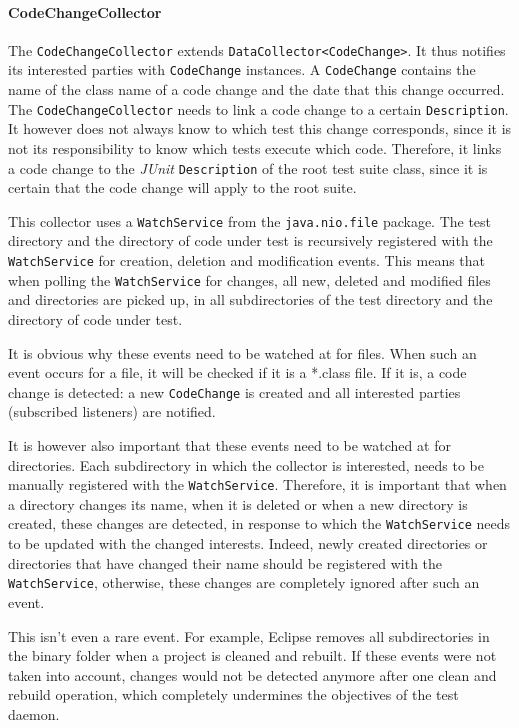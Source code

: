 \documentclass[i2]{oss}
\newcommand{\class}[1]{\texttt{#1}}
\newcommand{\junit}{\emph{JUnit }}
\begin{document}
\paragraph{CodeChangeCollector}

The \class{CodeChangeCollector} extends \class{DataCollector<CodeChange>}.
It thus notifies its interested parties with \class{CodeChange} instances.
A \class{CodeChange} contains the name of the class name of a code change and the date that this change occurred.
The \class{CodeChangeCollector} needs to link a code change to a certain \class{Description}.
It however does not always know to which test this change corresponds, since it is not its responsibility to know which tests execute which code.
Therefore, it links a code change to the \junit \class{Description} of the root test suite class, since it is certain that the code change will apply to the root suite.

This collector uses a \class{WatchService} from the \class{java.nio.file} package.
The test directory and the directory of code under test is recursively registered with the \class{WatchService} for creation, deletion and modification events.
This means that when polling the \class{WatchService} for changes, all new, deleted and modified files and directories are picked up, in all subdirectories of the test directory and the directory of code under test.

It is obvious why these events need to be watched at for files.
When such an event occurs for a file, it will be checked if it is a *.class file.
If it is, a code change is detected: a new \class{CodeChange} is created and all interested parties (subscribed listeners) are notified.

It is however also important that these events need to be watched at for directories.
Each subdirectory in which the collector is interested, needs to be manually registered with the \class{WatchService}.
Therefore, it is important that when a directory changes its name, when it is deleted or when a new directory is created, these changes are detected, in response to which the \class{WatchService} needs to be updated with the changed interests.
Indeed, newly created directories or directories that have changed their name should be registered with the \class{WatchService}, otherwise, these changes are completely ignored after such an event.

This isn't even a rare event. For example, Eclipse removes all subdirectories in the binary folder when a project is cleaned and rebuilt. If these events were not taken into account, changes would not be detected anymore after one clean and rebuild operation, which completely undermines the objectives of the test daemon.
\end{document}
